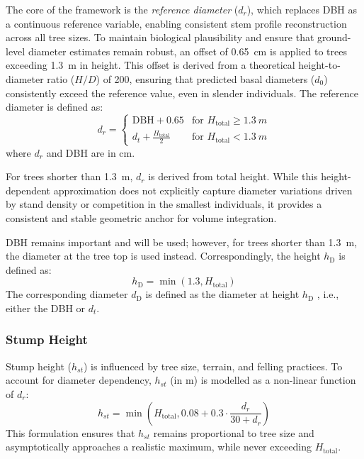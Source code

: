 \documentclass[twocolumn, bibliography=totoc]{scrartcl}
\begin{document}
The core of the framework is the \emph{reference diameter} ($d_r$), which replaces DBH as a continuous reference variable, enabling consistent stem profile reconstruction across all tree sizes. To maintain biological plausibility and ensure that ground-level diameter estimates remain robust, an offset of \qty{0.65}{cm} is applied to trees exceeding \qty{1.3}{m} in height. This offset is derived from a theoretical height-to-diameter ratio ($H/D$) of 200, ensuring that predicted basal diameters ($d_0$) consistently exceed the reference value, even in slender individuals. The reference diameter is defined as:
\begin{equation}
d_r =
\begin{cases}
\text{DBH} + 0.65 & \text{for } H_{\text{total}} \geq \qty{1.3}{m} \\
d_t + \frac{H_{\text{total}}}{2} & \text{for } H_{\text{total}} < \qty{1.3}{m}
\end{cases}
\end{equation}
where $d_r$ and DBH are in \unit{cm}.

For trees shorter than \qty{1.3}{m}, $d_r$ is derived from total height. While this height-dependent approximation does not explicitly capture diameter variations driven by stand density or competition in the smallest individuals, it provides a consistent and stable geometric anchor for volume integration.

DBH remains important and will be used; however, for trees shorter than \qty{1.3}{m}, the diameter at the tree top is used instead. Correspondingly, the height $h_{\text{D}}$ is defined as:
\begin{equation}
h_{\text{D}} = \min(1.3, H_{\text{total}})
\end{equation}
The corresponding diameter $d_{\text{D}}$ is defined as the diameter at height $h_{\text{D}}$ , i.e., either the DBH or $d_t$.

\subsubsection{Stump Height}

Stump height ($h_{st}$) is influenced by tree size, terrain, and felling practices. To account for diameter dependency, $h_{st}$ (in \unit{m}) is modelled as a non-linear function of $d_r$:
\begin{equation}
h_{st} = \min\left(H_{\text{total}}, 0.08 + 0.3 \cdot \frac{d_r}{30 + d_r}\right)
\end{equation}
This formulation ensures that $h_{st}$ remains proportional to tree size and asymptotically approaches a realistic maximum, while never exceeding $H_{\text{total}}$.
\end{document}

